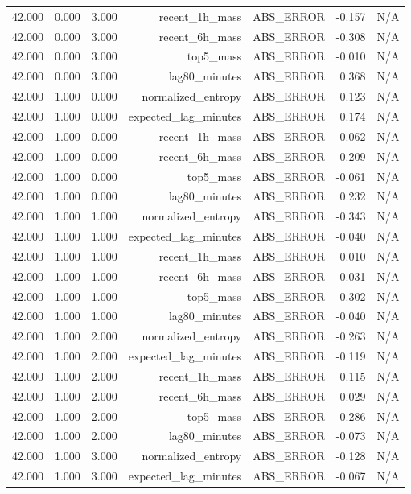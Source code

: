\begin{table}[h!]
\begin{tabular}{lrrrrrr}
42.000 & 0.000 & 3.000 & recent\_1h\_mass & ABS\_ERROR & -0.157 & N/A \\
42.000 & 0.000 & 3.000 & recent\_6h\_mass & ABS\_ERROR & -0.308 & N/A \\
42.000 & 0.000 & 3.000 & top5\_mass & ABS\_ERROR & -0.010 & N/A \\
42.000 & 0.000 & 3.000 & lag80\_minutes & ABS\_ERROR & 0.368 & N/A \\
42.000 & 1.000 & 0.000 & normalized\_entropy & ABS\_ERROR & 0.123 & N/A \\
42.000 & 1.000 & 0.000 & expected\_lag\_minutes & ABS\_ERROR & 0.174 & N/A \\
42.000 & 1.000 & 0.000 & recent\_1h\_mass & ABS\_ERROR & 0.062 & N/A \\
42.000 & 1.000 & 0.000 & recent\_6h\_mass & ABS\_ERROR & -0.209 & N/A \\
42.000 & 1.000 & 0.000 & top5\_mass & ABS\_ERROR & -0.061 & N/A \\
42.000 & 1.000 & 0.000 & lag80\_minutes & ABS\_ERROR & 0.232 & N/A \\
42.000 & 1.000 & 1.000 & normalized\_entropy & ABS\_ERROR & -0.343 & N/A \\
42.000 & 1.000 & 1.000 & expected\_lag\_minutes & ABS\_ERROR & -0.040 & N/A \\
42.000 & 1.000 & 1.000 & recent\_1h\_mass & ABS\_ERROR & 0.010 & N/A \\
42.000 & 1.000 & 1.000 & recent\_6h\_mass & ABS\_ERROR & 0.031 & N/A \\
42.000 & 1.000 & 1.000 & top5\_mass & ABS\_ERROR & 0.302 & N/A \\
42.000 & 1.000 & 1.000 & lag80\_minutes & ABS\_ERROR & -0.040 & N/A \\
42.000 & 1.000 & 2.000 & normalized\_entropy & ABS\_ERROR & -0.263 & N/A \\
42.000 & 1.000 & 2.000 & expected\_lag\_minutes & ABS\_ERROR & -0.119 & N/A \\
42.000 & 1.000 & 2.000 & recent\_1h\_mass & ABS\_ERROR & 0.115 & N/A \\
42.000 & 1.000 & 2.000 & recent\_6h\_mass & ABS\_ERROR & 0.029 & N/A \\
42.000 & 1.000 & 2.000 & top5\_mass & ABS\_ERROR & 0.286 & N/A \\
42.000 & 1.000 & 2.000 & lag80\_minutes & ABS\_ERROR & -0.073 & N/A \\
42.000 & 1.000 & 3.000 & normalized\_entropy & ABS\_ERROR & -0.128 & N/A \\
42.000 & 1.000 & 3.000 & expected\_lag\_minutes & ABS\_ERROR & -0.067 & N/A \\

\end{tabular}
\end{table}
